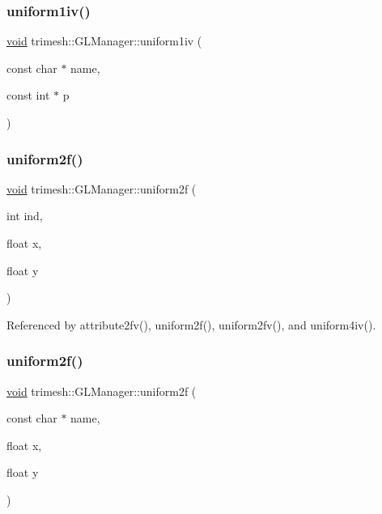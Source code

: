 \subsubsection{\texorpdfstring{uniform1iv()}{uniform1iv()}\hspace{0.1cm}{\footnotesize\ttfamily [2/2]}}
{\footnotesize\ttfamily \hyperlink{namespacetrimesh_a784ddfd979e1c579bda795a8edfc3f43}{void} trimesh\+::\+G\+L\+Manager\+::uniform1iv (\begin{DoxyParamCaption}\item[{const char $\ast$}]{name,  }\item[{const int $\ast$}]{p }\end{DoxyParamCaption})\hspace{0.3cm}{\ttfamily [inline]}}

\mbox{\label{classtrimesh_1_1GLManager_a832ba2745a8d2455a6951ce5ee305ac4}} 
\subsubsection{\texorpdfstring{uniform2f()}{uniform2f()}\hspace{0.1cm}{\footnotesize\ttfamily [1/2]}}
{\footnotesize\ttfamily \hyperlink{namespacetrimesh_a784ddfd979e1c579bda795a8edfc3f43}{void} trimesh\+::\+G\+L\+Manager\+::uniform2f (\begin{DoxyParamCaption}\item[{int}]{ind,  }\item[{float}]{x,  }\item[{float}]{y }\end{DoxyParamCaption})}



Referenced by attribute2fv(), uniform2f(), uniform2fv(), and uniform4iv().

\mbox{\label{classtrimesh_1_1GLManager_a96ee79a5860c9e28a0180c41de00d941}} 
\subsubsection{\texorpdfstring{uniform2f()}{uniform2f()}\hspace{0.1cm}{\footnotesize\ttfamily [2/2]}}
{\footnotesize\ttfamily \hyperlink{namespacetrimesh_a784ddfd979e1c579bda795a8edfc3f43}{void} trimesh\+::\+G\+L\+Manager\+::uniform2f (\begin{DoxyParamCaption}\item[{const char $\ast$}]{name,  }\item[{float}]{x,  }\item[{float}]{y }\end{DoxyParamCaption})\hspace{0.3cm}{\ttfamily [inline]}}

